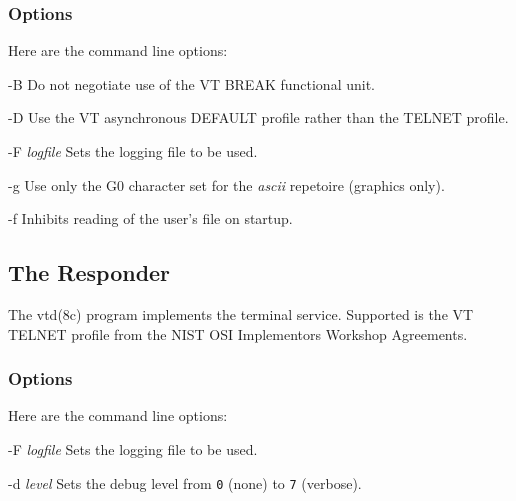 \subsubsection	{Options}
Here are the command line options:
\begin{describe}
\item[-B]
Do not negotiate use of the VT BREAK functional unit.

\item[-D]
Use the VT asynchronous DEFAULT profile rather than the TELNET profile.

\item[-F {\em logfile}]
Sets the logging file to be used.

\item[-g]
Use only the G0 character set for the {\it ascii\/} repetoire (graphics only).

\item[-f]
Inhibits reading of the user's  file on startup.
\end{describe}

\subsection	{The Responder}
The \man vtd(8c) program implements the terminal service.
Supported is the VT TELNET profile from the NIST OSI Implementors Workshop
Agreements.

\subsubsection	{Options}
Here are the command line options:
\begin{describe}
\item[-F {\em logfile}]
Sets the logging file to be used.

\item[-d {\em level}]
Sets the debug level from \verb"0" (none) to \verb"7" (verbose).
\end{describe}

